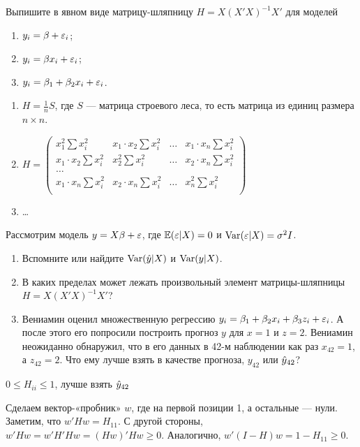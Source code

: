 \begin{problem}
Выпишите в явном виде матрицу-шляпницу $H=X(X'X)^{-1}X'$ для моделей
\begin{enumerate}
\item $y_i = \beta + \varepsilon_i$;
\item $y_i = \beta x_i + \varepsilon_i$;
\item $y_i = \beta_1 + \beta_2 x_i + \varepsilon_i$.
\end{enumerate}

\begin{sol}
\begin{enumerate}
\item $H = \frac{1}{n} S$, где $S$ — матрица строевого леса, то есть матрица из единиц размера $n\times n$.
\item $H = \begin{pmatrix}
x_1^2 \sum x_i^2 & x_1 \cdot x_2 \sum x_i^2 & \ldots & x_1 \cdot x_n  \sum x_i^2 \\
x_1 \cdot x_2 \sum x_i^2 & x_2^2 \sum x_i^2 & \ldots & x_2 \cdot x_n  \sum x_i^2 \\
\ldots \\
x_1 \cdot x_n \sum x_i^2 & x_2 \cdot x_n \sum x_i^2 & \ldots & x_n^2 \sum x_i^2 \\
\end{pmatrix}
$
\item \ldots
\end{enumerate}
\end{sol}

\end{problem}

\begin{problem}
Рассмотрим модель $y=X\beta + \varepsilon$, где $\mathbb{E}(\varepsilon|X)=0$ и $\operatorname{Var}(\varepsilon|X)=\sigma^2 I$.
\begin{enumerate}
\item Вспомните или найдите $\operatorname{Var}(\hat{y}|X)$ и $\operatorname{Var}(y|X)$.
\item В каких пределах может лежать произвольный элемент матрицы-шляпницы $H=X(X'X)^{-1}X'$?
\item Вениамин оценил множественную регрессию $y_i = \beta_1 + \beta_2 x_i + \beta_3 z_i + \varepsilon_i$. А после этого его попросили построить прогноз $y$ для $x=1$ и $z=2$. Вениамин неожиданно обнаружил, что в его данных в 42-м наблюдении как раз $x_{42}=1$, а $z_{42}=2$. Что ему лучше взять в качестве прогноза, $y_{42}$ или $\hat{y}_{42}$?
\end{enumerate}

\begin{sol}
$0 \leq H_{ii} \leq 1$,  лучше взять $\hat{y}_{42}$

Сделаем вектор-«пробник» $w$, где на первой позиции 1, а остальные — нули. Заметим, что $w'Hw=H_{11}$. С другой стороны, $w'Hw=w'H'Hw=(Hw)'Hw \geq 0$. Аналогично, $w'(I-H)w=1-H_{11}\geq 0$.
\end{sol}
\end{problem}


